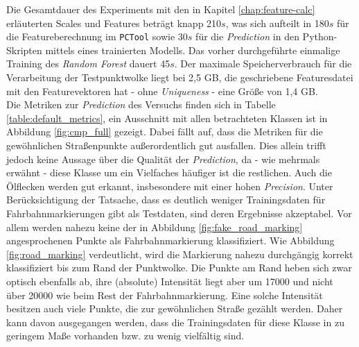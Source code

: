 Die Gesamtdauer des Experiments mit den in Kapitel \ref{chap:feature-calc} erläuterten Scales und Features beträgt knapp 210$s$, was sich aufteilt in 180$s$ für die Featureberechnung im \texttt{PCTool} sowie 30$s$ für die \textit{Prediction} in den Python-Skripten mittels eines trainierten Modells. Das vorher durchgeführte einmalige Training des \textit{Random Forest} dauert 45$s$. Der maximale Speicherverbrauch für die Verarbeitung der Testpunktwolke liegt bei 2,5 GB, die geschriebene Featuresdatei mit den Featurevektoren hat - ohne \textit{Uniqueness} - eine Größe von 1,4 GB. \\
Die Metriken zur \textit{Prediction} des Versuchs finden sich in Tabelle \ref{table:default_metrics}, ein Ausschnitt mit allen betrachteten Klassen ist in Abbildung \ref{fig:cmp_full} gezeigt. Dabei fällt auf, dass die Metriken für die gewöhnlichen Straßenpunkte außerordentlich gut ausfallen. Dies allein trifft jedoch keine Aussage über die Qualität der \textit{Prediction}, da - wie mehrmals erwähnt - diese Klasse um ein Vielfaches häufiger ist die restlichen. Auch die Ölflecken werden gut erkannt, insbesondere mit einer hohen \textit{Precision}. Unter Berücksichtigung der Tatsache, dass es deutlich weniger Trainingsdaten für Fahrbahnmarkierungen gibt als Testdaten, sind deren Ergebnisse akzeptabel. Vor allem werden nahezu keine der in Abbildung \ref{fig:fake_road_marking} angesprochenen Punkte als Fahrbahnmarkierung klassifiziert. Wie Abbildung \ref{fig:road_marking} verdeutlicht, wird die Markierung nahezu durchgängig korrekt klassifiziert bis zum Rand der Punktwolke. Die Punkte am Rand heben sich zwar optisch ebenfalls ab, ihre (absolute) Intensität liegt aber um 17000 und nicht über 20000 wie beim Rest der Fahrbahnmarkierung. Eine solche Intensität besitzen auch viele Punkte, die zur gewöhnlichen Straße gezählt werden. Daher kann davon ausgegangen werden, dass die Trainingsdaten für diese Klasse in zu geringem Maße vorhanden bzw. zu wenig vielfältig sind. \\\\
